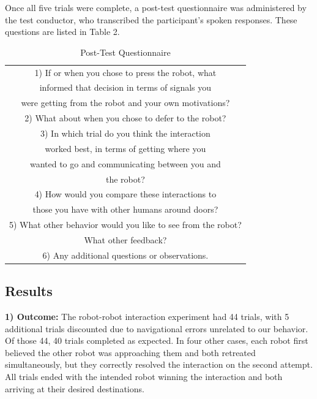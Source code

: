 \documentclass[letterpaper, 10 pt, conference]{ieeeconf}  %
\begin{document}
Once all five trials were complete, a post-test questionnaire was administered by the test conductor, who transcribed the participant’s spoken responses. These questions are listed in Table 2.

\begin{table}[h]
\caption{Post-Test Questionnaire}
\label{questionnaire_questions}
\begin{center}
\begin{tabular}{|c|}
\hline
1) If or when you chose to press the robot, what \\
informed that decision in terms of signals you \\
were getting from the robot and your own motivations?\\
\hline
2) What about when you chose to defer to the robot?\\
\hline
3) In which trial do you think the interaction \\
worked best, in terms of getting where you \\
wanted to go and communicating between you and \\
the robot?\\
\hline
4) How would you compare these interactions to \\
those you have with other humans around doors?\\
\hline
5) What other behavior would you like to see from the robot? \\
What other feedback?\\
\hline
6) Any additional questions or observations.\\
\hline
\end{tabular}
\end{center}
\end{table}

\subsection{Results}

\textbf{1) Outcome:} The robot-robot interaction experiment had 44 trials, with 5 additional trials discounted due to navigational errors unrelated to our behavior. Of those 44, 40 trials completed as expected.  In four other cases, each robot first believed the other robot was approaching them and both retreated simultaneously, but they correctly resolved the interaction on the second attempt. All trials ended with the intended robot winning the interaction and both arriving at their desired destinations.
\end{document}
